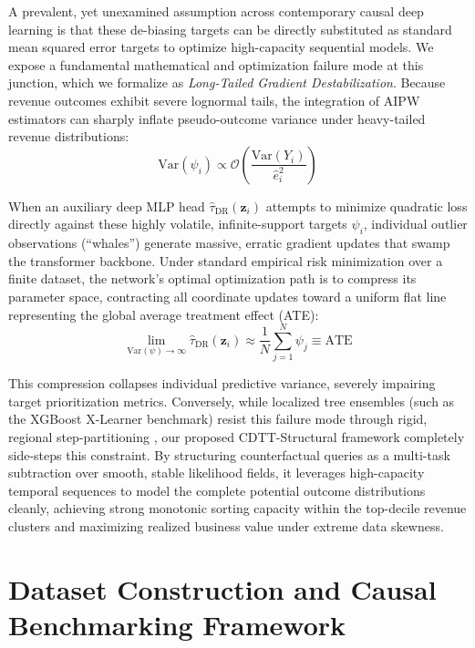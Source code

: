 \documentclass[10pt, conference]{IEEEtran}
\newcommand{\ourmodel}{CDTT}
\begin{document}
A prevalent, yet unexamined assumption across contemporary causal deep learning is that these de-biasing targets can be directly substituted as standard mean squared error targets to optimize high-capacity sequential models. We expose a fundamental mathematical and optimization failure mode at this junction, which we formalize as \textit{Long-Tailed Gradient Destabilization}. Because revenue outcomes exhibit severe lognormal tails, the integration of AIPW estimators can sharply inflate pseudo-outcome variance under heavy-tailed revenue distributions:
\begin{equation}
\text{Var}(\psi_i) \propto \mathcal{O}\left( \frac{\text{Var}(Y_i)}{\hat{e}_i^2} \right)
\end{equation}

When an auxiliary deep MLP head $\hat{\tau}_{\text{DR}}(\mathbf{z}_i)$ attempts to minimize quadratic loss directly against these highly volatile, infinite-support targets $\psi_i$, individual outlier observations (``whales'') generate massive, erratic gradient updates that swamp the transformer backbone. Under standard empirical risk minimization over a finite dataset, the network's optimal optimization path is to compress its parameter space, contracting all coordinate updates toward a uniform flat line representing the global average treatment effect (ATE):
\begin{equation}
\lim_{\text{Var}(\psi) \to \infty} \hat{\tau}_{\text{DR}}(\mathbf{z}_i) \approx \frac{1}{N}\sum_{j=1}^N \psi_j \equiv \text{ATE}
\end{equation}

This compression collapses individual predictive variance, severely impairing target prioritization metrics. Conversely, while localized tree ensembles (such as the XGBoost X-Learner benchmark) resist this failure mode through rigid, regional step-partitioning \cite{Kunzel2019, Nie2021}, our proposed \ourmodel-Structural framework completely side-steps this constraint. By structuring counterfactual queries as a multi-task subtraction over smooth, stable likelihood fields, it leverages high-capacity temporal sequences to model the complete potential outcome distributions cleanly, achieving strong monotonic sorting capacity within the top-decile revenue clusters and maximizing realized business value under extreme data skewness.

\section{Dataset Construction and Causal Benchmarking Framework}
\label{sec:experimental_setup}
\end{document}
